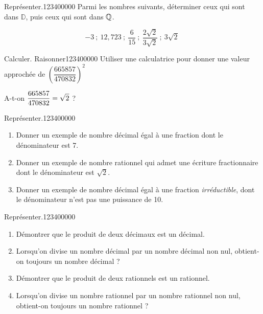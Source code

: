 \begin{pageAD}  %
\restoregeometry %




\begin{ExoCad}{Représenter.}{1234}{0}{0}{0}{0}{0}
Parmi les nombres suivants, déterminer ceux qui sont dans
$\mathbb D$, puis ceux qui sont dans $\mathbb Q$.

\[-3~;~12,723~;~\frac 6{15}~;~\frac{2\sqrt 2}{3\sqrt 2}~;~3\sqrt 2~ \]

\end{ExoCad}

\begin{ExoCad}{Calculer. Raisonner}{1234}{0}{0}{0}{0}{0}
Utiliser une calculatrice pour donner une valeur approchée de
$\left(\dfrac{665857}{470832}\right)^2$

A-t-on $\displaystyle \dfrac{665857}{470832}=\sqrt 2$ ?
\end{ExoCad}


\begin{ExoCad}{Représenter.}{1234}{0}{0}{0}{0}{0}
\begin{enumerate}
\item Donner un exemple de nombre décimal égal à une fraction dont le dénominateur est 7.
\item Donner un exemple de nombre rationnel qui admet une écriture fractionnaire dont le dénominateur est $\sqrt 2$.
\item Donner un exemple de nombre décimal égal à une fraction
{\em irréductible}, dont le dénominateur n'est pas
une puissance de 10.
\end{enumerate}
\end{ExoCad}

\begin{ExoCad}{Représenter.}{1234}{0}{0}{0}{0}{0}
\begin{enumerate}
\item Démontrer que le produit de deux décimaux est un décimal.
\item Lorsqu'on divise un nombre décimal par un nombre décimal non nul,
obtient-on toujours un nombre décimal ?
\item Démontrer que le produit de deux rationnels est un rationnel.
\item Lorsqu'on divise un nombre rationnel par un nombre rationnel non nul,
obtient-on toujours un nombre rationnel ?
\end{enumerate}
\end{ExoCad}

 
\end{pageAD} %

